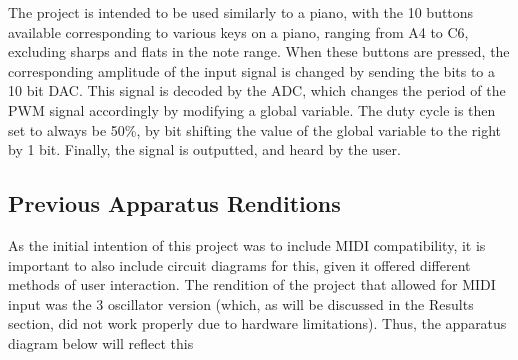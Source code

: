The project is intended to be used similarly to a piano, with the 10 buttons available corresponding to various keys on a piano, ranging from A4 to C6, excluding sharps and flats in the note range.
When these buttons are pressed, the corresponding amplitude of the input signal is changed by sending the bits to a 10 bit DAC\@.
This signal is decoded by the ADC, which changes the period of the PWM signal accordingly by modifying a global variable.
The duty cycle is then set to always be 50\%, by bit shifting the value of the global variable to the right by 1 bit.
Finally, the signal is outputted, and heard by the user. 

\subsection{Previous Apparatus Renditions}\label{subsec:previous-apparatus-renditions}

As the initial intention of this project was to include MIDI compatibility, it is important to also include circuit diagrams for this, given it offered different methods of user interaction.
The rendition of the project that allowed for MIDI input was the 3 oscillator version (which, as will be discussed in the Results section, did not work properly due to hardware limitations).
Thus, the apparatus diagram below will reflect this
